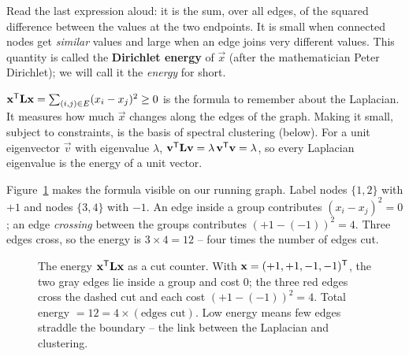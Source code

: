 Read the last expression aloud: it is the sum, over all edges, of the squared difference
between the values at the two endpoints. It is small when connected nodes get
\emph{similar} values and large when an edge joins very different values. This quantity is
called the \textbf{Dirichlet energy} of $\vec x$ (after the mathematician Peter Dirichlet);
we will call it the \emph{energy} for short.

\begin{focusbox}
$\mathbf{x}^{\mathsf{T}}\mathbf{L}\mathbf{x} = \sum_{(i,j)\in E}(x_i - x_j)^2 \ge 0$ is the formula to
remember about the Laplacian. It measures how much $\vec{x}$ changes along the edges of the
graph. Making it small, subject to constraints, is the basis of spectral clustering
(below). For a unit eigenvector $\vec v$ with eigenvalue $\lambda$,
$\mathbf{v}^{\mathsf{T}}\mathbf{L}\mathbf{v} = \lambda\,\mathbf{v}^{\mathsf{T}}\mathbf{v} = \lambda$, so every Laplacian eigenvalue is
the energy of a unit vector.
\end{focusbox}

Figure~\ref{ch35:fig-cut} makes the formula visible on our running graph. Label nodes
$\{1,2\}$ with $+1$ and nodes $\{3,4\}$ with $-1$. An edge inside a group contributes
$(x_i-x_j)^2 = 0$; an edge \emph{crossing} between the groups contributes
$(+1-(-1))^2 = 4$. Three edges cross, so the energy is $3 \times 4 = 12$ -- four times the
number of edges cut.

\begin{figure}[H]
\centering
{}
\caption{The energy $\mathbf{x}^{\mathsf{T}}\mathbf{L}\mathbf{x}$ as a cut counter. With $\mathbf{x}=(+1,+1,-1,-1)^{\mathsf{T}}$,
the two gray edges lie inside a group and cost $0$; the three red edges cross the dashed cut
and each cost $(+1-(-1))^2 = 4$. Total energy $= 12 = 4 \times (\text{edges cut})$. Low energy
means few edges straddle the boundary -- the link between the Laplacian and clustering.}
\label{ch35:fig-cut}
\end{figure}

